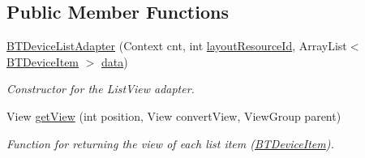 \subsection*{Public Member Functions}
\begin{DoxyCompactItemize}
\item 
\hyperlink{class_android_app_1_1_b_t_device_list_adapter_a6d4d0dc1f894bbb2378a71eea4907bb0}{B\+T\+Device\+List\+Adapter} (Context cnt, int \hyperlink{class_android_app_1_1_b_t_device_list_adapter_ae0c8b1482e416a5b242dcec87b83f661}{layout\+Resource\+Id}, Array\+List$<$ \hyperlink{class_android_app_1_1_b_t_device_item}{B\+T\+Device\+Item} $>$ \hyperlink{class_android_app_1_1_b_t_device_list_adapter_a210dbb300083d9029aa960841c8aa505}{data})
\begin{DoxyCompactList}\small\item\em Constructor for the List\+View adapter. \end{DoxyCompactList}\item 
View \hyperlink{class_android_app_1_1_b_t_device_list_adapter_a3e2ad44a1c55bddc7102aa36ab18ddb0}{get\+View} (int position, View convert\+View, View\+Group parent)
\begin{DoxyCompactList}\small\item\em Function for returning the view of each list item (\hyperlink{class_android_app_1_1_b_t_device_item}{B\+T\+Device\+Item}). \end{DoxyCompactList}\end{DoxyCompactItemize}
